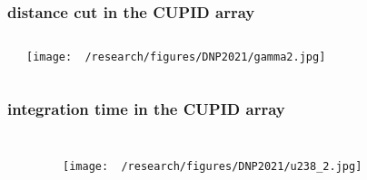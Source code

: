 \documentclass{beamer}
\begin{document}


	\begin{frame}
		\frametitle{distance cut in the CUPID array}
		\begin{columns}[c] %
			
			\begin{itemize}
			\end{itemize}
			
			
			\texttt{[image: ~/research/figures/DNP2021/gamma2.jpg]}
			
			
		\end{columns}
	\end{frame}



	\begin{frame}
		\frametitle{integration time in the CUPID array}
		\begin{columns}[c] %
			
			\begin{itemize}
			\end{itemize}
			
			\begin{figure}
			\texttt{[image: ~/research/figures/DNP2021/u238\_2.jpg]}
			\end{figure}
			
		\end{columns}
	\end{frame}
\end{document}
